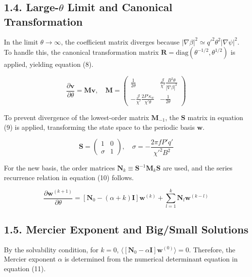 \documentclass[11pt,a4paper]{article}
\begin{document}
\subsection{1.4. Large-\(\theta\) Limit and Canonical Transformation}\label{large-theta-limit-and-canonical-transformation}

In the limit \(\theta \to \infty\), the coefficient matrix diverges because
\(|\nabla\beta|^2 \simeq q'^2 \theta^2 |\nabla\psi|^2\). To handle this, the
canonical transformation matrix \(\mathbf{R} = \text{diag}(\theta^{-1/2}, \theta^{1/2})\)
is applied, yielding equation (8).

\[ \frac{\partial \mathbf{v}}{\partial\theta} = \mathbf{M}\mathbf{v}, \quad \mathbf{M} = \begin{pmatrix} \frac{1}{2\theta} & \frac{\mathcal{J}}{\chi'} \frac{B^2\theta}{|\nabla\beta|^2} \\ -\frac{\mathcal{J}}{\chi'} \frac{2P'\kappa_w}{\chi'\theta} & -\frac{1}{2\theta} \end{pmatrix} \tag{8} \]

To prevent divergence of the lowest-order matrix \(\mathbf{M}_{-1}\), the
\(\mathbf{S}\) matrix in equation (9) is applied, transforming the state space to
the periodic basis \(\mathbf{w}\).

\[ \mathbf{S} = \begin{pmatrix} 1 & 0 \\ \sigma & 1 \end{pmatrix}, \quad \sigma = -\frac{2\pi f P' q'}{\chi'^2 B^2} \tag{9} \]

For the new basis, the order matrices
\(\mathbf{N}_k \equiv \mathbf{S}^{-1}\mathbf{M}_k\mathbf{S}\) are used, and the
series recurrence relation in equation (10) follows.

\[ \frac{\partial \mathbf{w}^{(k+1)}}{\partial\theta} = [\mathbf{N}_0 - (\alpha+k)\mathbf{I}]\mathbf{w}^{(k)} + \sum_{l=1}^{k} \mathbf{N}_l \mathbf{w}^{(k-l)} \tag{10} \]

\subsection{1.5. Mercier Exponent and Big/Small Solutions}\label{mercier-exponent-and-bigsmall-solutions}

By the solvability condition, for \(k=0\),
\(\langle [\mathbf{N}_0 - \alpha\mathbf{I}] \mathbf{w}^{(0)} \rangle = 0\).
Therefore, the Mercier exponent \(\alpha\) is determined from the numerical
determinant equation in equation (11).
\end{document}
